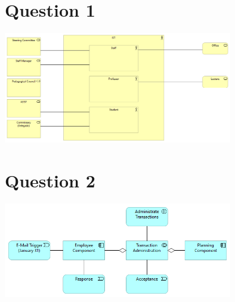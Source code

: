 \documentclass[a4paper,12pt]{texDoc}
\begin{document}
\maketitle %


\section*{Question 1}

\begin{center}
\includegraphics[width=0.75\textwidth]{ea_h3.png}
\end{center}

\section*{Question 2}

\begin{center}
\includegraphics[width=0.75\textwidth]{ea_h3_collaboration_diagram.png}
\end{center}

\break




\end{document}
